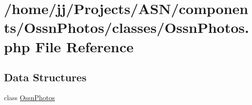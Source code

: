\hypertarget{classes_2_ossn_photos_8php}{}\section{/home/jj/\+Projects/\+A\+S\+N/components/\+Ossn\+Photos/classes/\+Ossn\+Photos.php File Reference}
\label{classes_2_ossn_photos_8php}
\subsection*{Data Structures}
\begin{DoxyCompactItemize}
\item 
class \hyperlink{class_ossn_photos}{Ossn\+Photos}
\end{DoxyCompactItemize}
